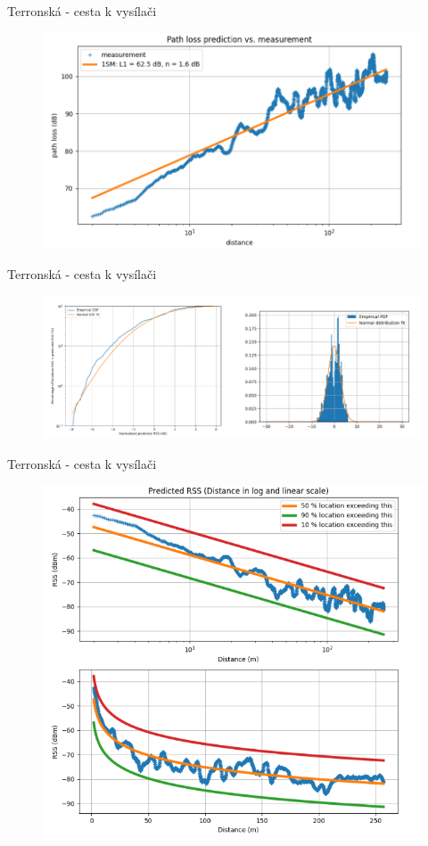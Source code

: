 \documentclass[aspectratio=169, 12pt, hyperref={unicode}]{beamer}
\begin{document}
\begin{frame}{Terronská - cesta k vysílači}
	\begin{figure}[!ht]
		\centering
		\includegraphics[width=.75\textwidth]{src/terronska-k-vysilaci-1.png}
	\end{figure}
\end{frame}
\begin{frame}{Terronská - cesta k vysílači}
	\begin{figure}[!ht]
		\centering
		\includegraphics[width=.9\textwidth]{src/terronska-k-vysilaci-2.png}
	\end{figure}
\end{frame}
\begin{frame}{Terronská - cesta k vysílači}
	\begin{figure}[!ht]
		\centering
		\includegraphics[width=.5\textwidth]{src/terronska-k-vysilaci-3.png}
	\end{figure}
\end{frame}
\end{document}
